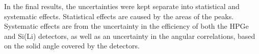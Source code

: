 In the final results, the uncertainties were kept separate into statistical and systematic effects. Statistical effects are caused by the areas of the peaks. Systematic effects are from the uncertainty in the efficiency of both the HPGe and Si(Li) detectors, as well as an uncertainty in the angular correlations, based on the solid angle covered by the detectors.